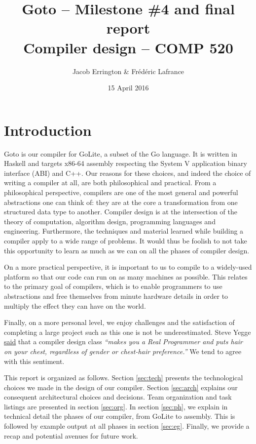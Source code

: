 \documentclass[letterpaper,11pt]{article}
\title{Goto -- Milestone \#4 and final report\\Compiler design -- COMP 520}
\author{Jacob Errington \& Fr\'ed\'eric Lafrance}
\date{15 April 2016}
\begin{document}
\maketitle

\section{Introduction}
\label{sec:intro}

Goto is our compiler for GoLite, a subset of the Go language. It is written in Haskell and targets x86-64 assembly respecting the System V application binary interface (ABI) and C++. Our reasons for these choices, and indeed the choice of writing a compiler at all, are both philosophical and practical. From a philosophical perspective, compilers are one of the most general and powerful abstractions one can think of: they are at the core a transformation from one structured data type to another. Compiler design is at the intersection of the theory of computation, algorithm design, programming languages and engineering. Furthermore, the techniques and material learned while building a compiler apply to a wide range of problems. It would thus be foolish to not take this opportunity to learn as much as we can on all the phases of compiler design.

On a more practical perspective, it is important to us to compile to a widely-used platform so that our code can run on as many machines as possible. This relates to the primary goal of compilers, which is to enable programmers to use abstractions and free themselves from minute hardware details in order to multiply the effect they can have on the world. 

Finally, on a more personal level, we enjoy challenges and the satisfaction of completing a large project such as this one is not be underestimated. Steve Yegge \href{http://steve-yegge.blogspot.ca/2007/06/rich-programmer-food.html}{said} that a compiler design class \emph{``makes you a Real Programmer and puts hair on your chest, regardless of gender or chest-hair preference.''} We tend to agree with this sentiment.

This report is organized as follows. Section \ref{sec:tech} presents the technological choices we made in the design of our compiler. Section \ref{sec:arch} explains our consequent architectural choices and decisions. Team organization and task listings are presented in section \ref{sec:org}. In section \ref{sec:ph}, we explain in technical detail the phases of our compiler, from GoLite to assembly. This is followed by example output at all phases in section \ref{sec:eg}. Finally, we provide a recap and potential avenues for future work.
\end{document}
